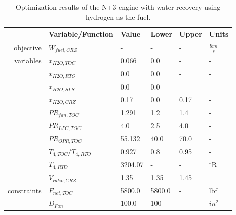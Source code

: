 \documentclass[conf]{new-aiaa}
\begin{document}
\begin{table}[hbt!]
    \centering
    \caption{Optimization results of the N+3 engine with water recovery using hydrogen as the fuel.
    }
    \small
    \renewcommand{\arraystretch}{1.2}
    \begin{tabular}{r l l l l l}
                    & Variable/Function     & Value   & Lower  & Upper & Units           \\
        \toprule
        objective   & $W_{fuel,CRZ}$        & -       & -      & -     & $\frac{lbm}{s}$ \\
        \hline
        variables   & $x_{H2O,TOC}$         & 0.066   & 0.0    & -     & -               \\
                    & $x_{H2O,RTO}$         & 0.0     & 0.0    & -     & -               \\
                    & $x_{H2O,SLS}$         & 0.0     & 0.0    & -     & -               \\
                    & $x_{H2O,CRZ}$         & 0.17    & 0.0    & 0.17  & -               \\
                    & $PR_{fan,TOC}$        & 1.291   & 1.2    & 1.4   & -               \\
                    & $PR_{LPC,TOC}$        & 4.0     & 2.5    & 4.0   & -               \\
                    & $PR_{OPR,TOC}$        & 55.132  & 40.0   & 70.0  & -               \\
                    & $T_{4,TOC}/T_{4,RTO}$ & 0.927   & 0.8    & 0.95  & -               \\
                    & $T_{4,RTO}$           & 3204.07 & -      & -     & $^\circ$R       \\
                    & $V_{ratio,CRZ}$       & 1.35    & 1.35   & 1.45  &                 \\
        \hline
        constraints & $F_{net,TOC}$         & 5800.0  & 5800.0 & -     & lbf             \\
                    & $D_{Fan}$             & 100.0   & 100    & -     & $in^2$          \\
        \bottomrule
    \end{tabular}
    \label{tab:res_full_opt_H2}
\end{table}
\end{document}
